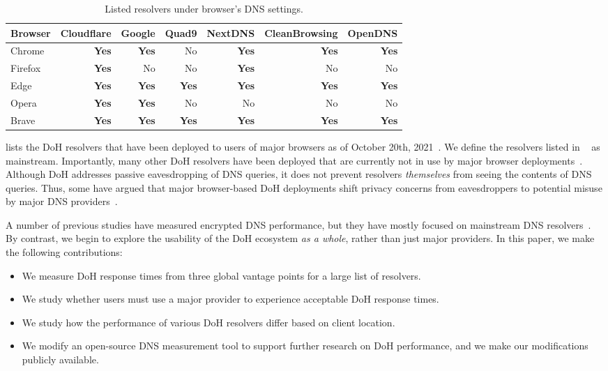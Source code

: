 \begin{table}
    \centering
    \begin{tabular}{lrrrrrr}
    \hline
    Browser & Cloudflare & Google & Quad9 & NextDNS & CleanBrowsing & OpenDNS
    \\
    \midrule
    Chrome    & \textbf{Yes} & \textbf{Yes} & No & \textbf{Yes} & \textbf{Yes} & \textbf{Yes} \\
    Firefox  & \textbf{Yes} & No & No & \textbf{Yes} & No & No \\ 
    Edge   & \textbf{Yes} & \textbf{Yes} & \textbf{Yes} & \textbf{Yes} & \textbf{Yes} & \textbf{Yes} \\
    Opera            & \textbf{Yes} & \textbf{Yes} & No & No & No & No \\
    Brave            & \textbf{Yes} & \textbf{Yes} & \textbf{Yes} & \textbf{Yes} & \textbf{Yes} & \textbf{Yes} \\
    \bottomrule
    \end{tabular}
    \caption{Listed resolvers under browser's DNS settings.}
    \label{tab:SupportedResolvers}
\end{table}

 lists the DoH resolvers that have been deployed to users of major browsers as of October 20th, 2021~\cite{bravebrowser,edgebrowser,ffbrowser,chromebrowser,operabrowser}.
We define the resolvers listed in ~ as mainstream. 
Importantly, many other DoH resolvers have been deployed that are currently not in use by major browser deployments~\cite{dnscrypt}.
Although DoH addresses passive eavesdropping of DNS queries, it does not prevent resolvers \emph{themselves} from seeing the contents of DNS queries.
Thus, some have argued that major browser-based DoH deployments shift privacy concerns from eavesdroppers to potential misuse by major DNS providers~\cite{vixie}.

A number of previous studies have measured encrypted DNS performance, but they have mostly focused on mainstream DNS resolvers~\cite{borgolte2019dns,hounsel2020comparing,KResolver,lu2019end-to-end}.
By contrast, we begin to explore the usability of the DoH ecosystem \emph{as a whole}, rather than just major providers.
In this paper, we make the following contributions:
\begin{itemize}
    \item We measure DoH response times from three global vantage points for a large list of resolvers.
    \item We study whether users must use a major provider to experience acceptable DoH response times.
    \item We study how the performance of various DoH resolvers differ based on client location.
    \item We modify an open-source DNS measurement tool to support further research on DoH performance, and we make our modifications publicly available.
\end{itemize}

